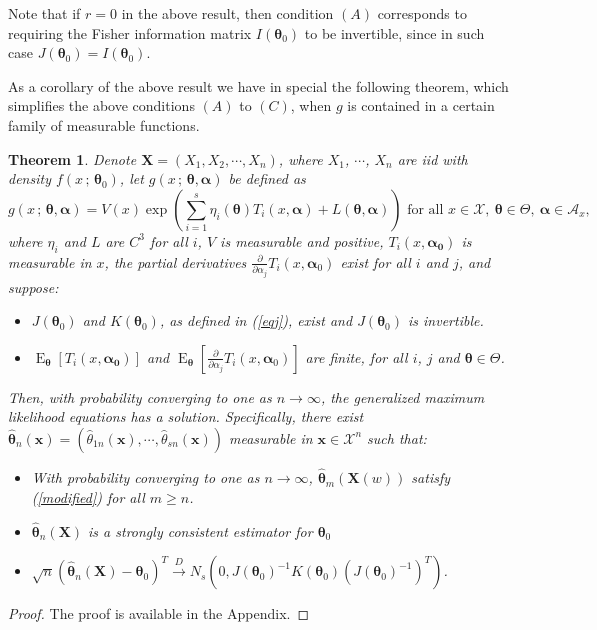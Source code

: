 \documentclass[10pt,a4paper,onecolumn]{article} %
\newcommand{\f}{\on}
\newtheorem{theorem}{Theorem}[section]
\newcommand{\bs}{\boldsymbol}
\newcommand{\on}{\operatorname}
\begin{document}
Note that if $r=0$ in the above result, then condition $(A)$ corresponds to requiring the Fisher information matrix $I(\bs{\theta}_0)$ to be invertible, since in such case $J(\bs{\theta}_0)=I(\bs{\theta}_0)$.

As a corollary of the above result we have in special the following theorem, which simplifies the above conditions $(A)$ to $(C)$, when $g$ is contained in a certain family of measurable functions.

\begin{theorem}\label{princ} Denote $\bs{X}=\left(X_1, X_2, \cdots, X_n\right)$, where $X_1$, $\cdots$, $X_n$ are iid with density $f(x\,;\,\bs{\theta}_0)$, let $g(x\,;\,\bs{\theta},\bs{\alpha})$ be defined as
\begin{equation*}g(x\,;\,\bs{\theta},\bs{\alpha})=V(x)\exp\left(\sum_{i=1}^s \eta_i(\bs{\theta})T_i(x,\bs{\alpha})+L(\bs{\theta},\bs{\alpha})\right)\mbox{ for all }x\in \mathcal{X},\ \bs{\theta}\in \Theta,\ \bs{\alpha}\in \mathcal{A}_x,
\end{equation*}
where $\eta_i$ and $L$ are $C^3$ for all $i$, $V$ is  measurable and positive,  $T_i(x,\bs{\alpha_0})$ is measurable in $x$, the partial derivatives $\frac{\partial}{\partial \alpha_j} T_i(x,\bs{\alpha}_0)$ exist for all $i$ and $j$, and suppose:
\begin{itemize}
\item[(A)]  $J(\bs{\theta}_0)$ and $K(\bs{\theta}_0)$, as defined in (\ref{eqj}), exist and $J(\bs{\theta}_0)$ is invertible.
\item[(B)] $\f{E}_{\bs{\theta}}\left[T_i(x,\bs{\alpha_0})\right]$ and $\f{E}_{\bs{\theta}}\left[\frac{\partial}{\partial \alpha_j} T_i(x,\bs{\alpha}_0)\right]$ are finite, for all $i$, $j$ and $\bs{\theta}\in \Theta$.
\end{itemize}
Then, with probability converging to one as $n\to \infty$, the generalized maximum likelihood equations has a solution. Specifically, there exist  $\bs{\hat{\theta}}_n(\bs{x})=(\hat{\theta}_{1n}(\bs{x}),\cdots,\hat{\theta}_{sn}(\bs{x}))$ measurable in $\bs{x}\in \mathcal{X}^n$ such that:
\begin{itemize}
\item[I)] With probability converging to one as $n\to \infty$, $\bs{\hat{\theta}}_m(\bs{X}(w))$ satisfy (\ref{modified}) for all $m\geq n$.
\item[II)] $\bs{\hat{\theta}}_n(\bs{X})$ is a strongly consistent estimator for $\bs{\theta}_0$
\item[III)]
$\sqrt{n}(\bs{\hat{\theta}}_n(\bs{X})-\bs{\theta}_0)^T\overset{D}{\to} N_s\left(0,J(\bs{\theta}_0)^{-1} K(\bs{\theta}_0)(J(\bs{\theta}_0)^{-1})^T\right)$.
\end{itemize}
\end{theorem}
\begin{proof} The proof is available in the Appendix.
 \end{proof}
\end{document}
